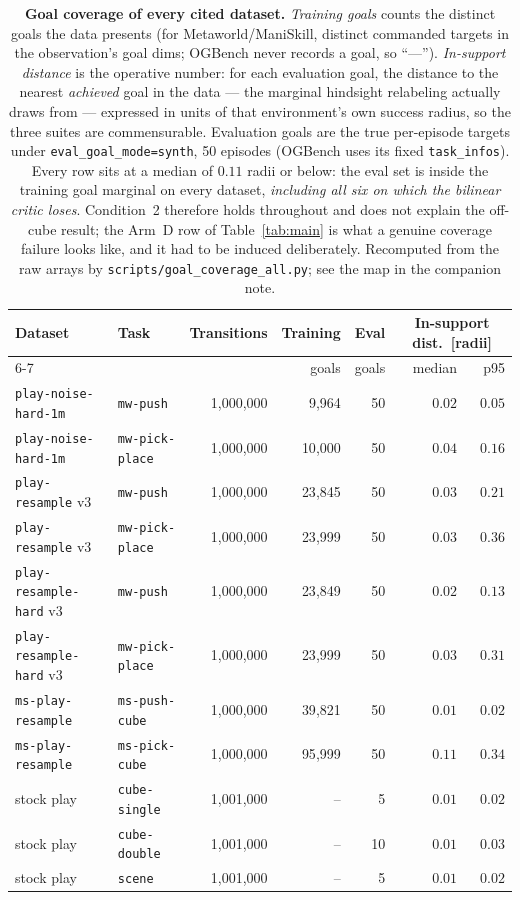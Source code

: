 \documentclass[10pt]{article}
\begin{document}
\begin{table}[h]\centering
\caption{\textbf{Goal coverage of every cited dataset.} \emph{Training goals} counts the
distinct goals the data presents (for Metaworld/ManiSkill, distinct commanded targets in the
observation's goal dims; OGBench never records a goal, so ``---''). \emph{In-support
distance} is the operative number: for each evaluation goal, the distance to the nearest
\emph{achieved} goal in the data --- the marginal hindsight relabeling actually draws from
--- expressed in units of that environment's own success radius, so the three suites are
commensurable. Evaluation goals are the true per-episode targets under
\texttt{eval\_goal\_mode=synth}, 50 episodes (OGBench uses its fixed \texttt{task\_infos}).
Every row sits at a median of $0.11$ radii or below: the eval set is inside the training
goal marginal on every dataset, \emph{including all six on which the bilinear critic loses}.
Condition~2 therefore holds throughout and does not explain the off-cube result; the Arm~D
row of Table~\ref{tab:main} is what a genuine coverage failure looks like, and it had to be
induced deliberately. Recomputed from the raw arrays by
\texttt{scripts/goal\_coverage\_all.py}; see the map in the companion note.}
\label{tab:coverage}
\setlength{\tabcolsep}{6pt}
\begin{tabular}{ll rrr rr}
\toprule
\multirow{2}{*}{Dataset} & \multirow{2}{*}{Task} & \multirow{2}{*}{Transitions}
 & Training & Eval & \multicolumn{2}{c}{In-support dist.\ [radii]} \\
\cmidrule(l){6-7}
 & & & goals & goals & median & p95 \\
\midrule
\texttt{play-noise-hard-1m} & \texttt{mw-push} & 1{,}000{,}000 & 9{,}964 & 50 & $0.02$ & $0.05$ \\
\texttt{play-noise-hard-1m} & \texttt{mw-pick-place} & 1{,}000{,}000 & 10{,}000 & 50 & $0.04$ & $0.16$ \\
\texttt{play-resample} v3 & \texttt{mw-push} & 1{,}000{,}000 & 23{,}845 & 50 & $0.03$ & $0.21$ \\
\texttt{play-resample} v3 & \texttt{mw-pick-place} & 1{,}000{,}000 & 23{,}999 & 50 & $0.03$ & $0.36$ \\
\texttt{play-resample-hard} v3 & \texttt{mw-push} & 1{,}000{,}000 & 23{,}849 & 50 & $0.02$ & $0.13$ \\
\texttt{play-resample-hard} v3 & \texttt{mw-pick-place} & 1{,}000{,}000 & 23{,}999 & 50 & $0.03$ & $0.31$ \\
\midrule
\texttt{ms-play-resample} & \texttt{ms-push-cube} & 1{,}000{,}000 & 39{,}821 & 50 & $0.01$ & $0.02$ \\
\texttt{ms-play-resample} & \texttt{ms-pick-cube} & 1{,}000{,}000 & 95{,}999 & 50 & $0.11$ & $0.34$ \\
\midrule
stock play & \texttt{cube-single} & 1{,}001{,}000 & -- & 5 & $0.01$ & $0.02$ \\
stock play & \texttt{cube-double} & 1{,}001{,}000 & -- & 10 & $0.01$ & $0.03$ \\
stock play & \texttt{scene} & 1{,}001{,}000 & -- & 5 & $0.01$ & $0.02$ \\
\bottomrule
\end{tabular}
\end{table}
\end{document}
